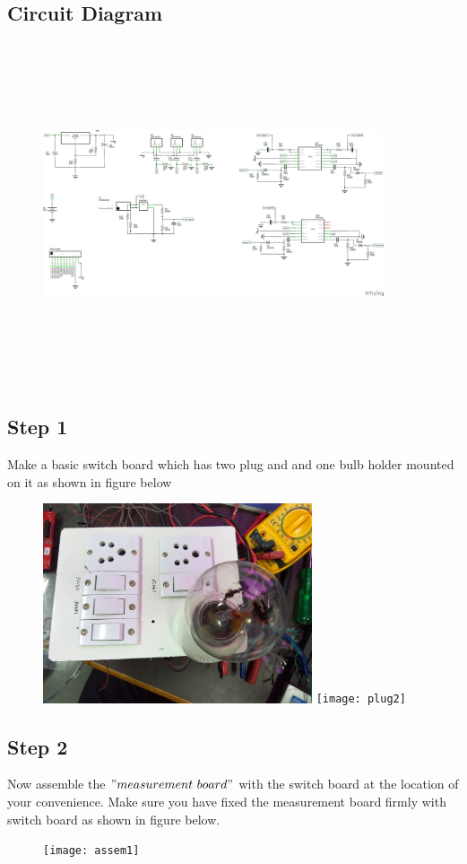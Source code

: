 \documentclass[a4paper,12pt,oneside]{book}
\begin{document}
\subsection*{Circuit Diagram}
\begin{figure}[h]
	\includegraphics[width=380px,height=380px]{schematic}
\end{figure}
\newpage
\subsection*{Step 1}
Make a basic switch board which has two plug and and one bulb holder mounted on it as 
shown in figure below
\begin{figure}[h]
	\includegraphics[width=300px]{plug1}
	\texttt{[image: plug2]}
\end{figure}
\newpage
\subsection*{Step 2}
Now assemble the $"measurement\ board"$ with the switch board at the location of your convenience. Make sure you have fixed the measurement board firmly with switch board as shown in figure below. 
\begin{figure}[h]
	\texttt{[image: assem1]}
\end{figure}
\end{document}
